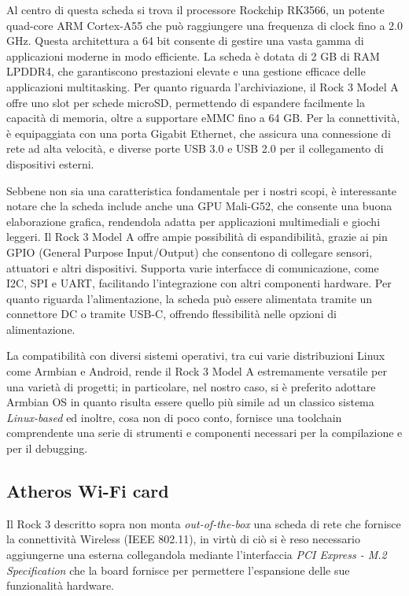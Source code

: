 Al centro di questa scheda si trova il processore Rockchip RK3566, un potente quad-core ARM Cortex-A55 che può raggiungere una frequenza di clock fino a 2.0 GHz. Questa architettura a 64 bit consente di gestire una vasta gamma di applicazioni moderne in modo efficiente. La scheda è dotata di 2 GB di RAM LPDDR4, che garantiscono prestazioni elevate e una gestione efficace delle applicazioni multitasking. Per quanto riguarda l'archiviazione, il Rock 3 Model A offre uno slot per schede microSD, permettendo di espandere facilmente la capacità di memoria, oltre a supportare eMMC fino a 64 GB. Per la connettività, è equipaggiata con una porta Gigabit Ethernet, che assicura una connessione di rete ad alta velocità, e diverse porte USB 3.0 e USB 2.0 per il collegamento di dispositivi esterni. 

Sebbene non sia una caratteristica fondamentale per i nostri scopi, è interessante notare che la scheda include anche una GPU Mali-G52, che consente una buona elaborazione grafica, rendendola adatta per applicazioni multimediali e giochi leggeri. Il Rock 3 Model A offre ampie possibilità di espandibilità, grazie ai pin GPIO (General Purpose Input/Output) che consentono di collegare sensori, attuatori e altri dispositivi. Supporta varie interfacce di comunicazione, come I2C, SPI e UART, facilitando l'integrazione con altri componenti hardware. Per quanto riguarda l'alimentazione, la scheda può essere alimentata tramite un connettore DC o tramite USB-C, offrendo flessibilità nelle opzioni di alimentazione.

La compatibilità con diversi sistemi operativi, tra cui varie distribuzioni Linux come Armbian e Android, rende il Rock 3 Model A estremamente versatile per una varietà di progetti; in particolare, nel nostro caso, si è preferito adottare Armbian OS in quanto risulta essere quello più simile ad un classico sistema \textit{Linux-based} ed inoltre, cosa non di poco conto, fornisce una toolchain comprendente una serie di strumenti e componenti necessari per la compilazione e per il debugging.

\subsection[Atheros Wi-Fi card]{Atheros Wi-Fi card}
Il Rock 3 descritto sopra non monta \textit{out-of-the-box} una scheda di rete che fornisce la connettività Wireless (IEEE 802.11), in virtù di ciò si è reso necessario aggiungerne una esterna collegandola mediante l'interfaccia \textit{PCI Express - M.2 Specification} che la board fornisce per permettere l'espansione delle sue funzionalità hardware.

